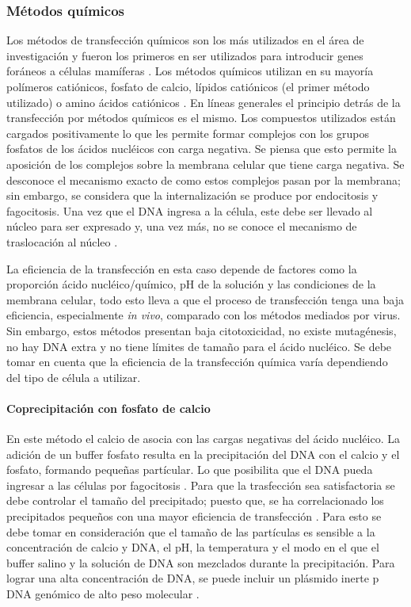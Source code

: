 \documentclass[fleqn,10pt]{SelfArx} %
\begin{document}
\subsubsection{Métodos químicos}
Los métodos de transfección químicos son los más utilizados en el área de investigación y fueron los primeros en ser utilizados para introducir genes foráneos a células mamíferas \cite{Schenborn2000}. Los métodos químicos utilizan en su mayoría polímeros catiónicos, fosfato de calcio, lípidos catiónicos (el primer método utilizado) o amino ácidos catiónicos \cite{Schenborn2000, Holmen:1995aa, Washbourne:2002aa}. En líneas generales el principio detrás de la transfección por métodos químicos es el mismo. Los compuestos utilizados están cargados positivamente lo que les permite formar complejos con los grupos fosfatos de los ácidos nucléicos con carga negativa. Se piensa que esto permite la aposición de los complejos sobre la membrana celular que tiene carga negativa. Se desconoce el mecanismo exacto de como estos complejos pasan por la membrana; sin embargo, se considera que la internalización se produce por endocitosis y fagocitosis. Una vez que el DNA ingresa a la célula, este debe ser llevado al núcleo para ser expresado y, una vez más, no se conoce el mecanismo de traslocación al núcleo \cite{Kim:2010aa}. 


La eficiencia de la transfección en esta caso depende de factores como la proporción ácido nucléico/químico, pH de la solución y las condiciones de la membrana celular, todo esto lleva a que el proceso de transfección tenga una baja eficiencia, especialmente \textit{in vivo}, comparado con los métodos mediados por virus. Sin embargo, estos métodos presentan baja citotoxicidad, no existe mutagénesis, no hay DNA extra y no tiene límites de tamaño para el ácido nucléico. Se debe tomar en cuenta que la eficiencia de la transfección química varía dependiendo del tipo de célula a utilizar.

\paragraph*{Coprecipitación con fosfato de calcio}
En este método el calcio de asocia con las cargas negativas del ácido nucléico. La adición de un buffer fosfato resulta en la precipitación del DNA con el calcio y el fosfato, formando pequeñas partícular.  Lo que posibilita que el DNA pueda ingresar a las células por fagocitosis \cite{Loyter:1982aa}. Para que la trasfección sea satisfactoria se debe controlar el tamaño del precipitado; puesto que, se ha correlacionado los precipitados pequeños con una mayor eficiencia de transfección \cite{Jordan:1996aa}. Para esto se debe tomar en consideración que el tamaño de las partículas es sensible a la concentración de calcio y DNA, el pH, la temperatura y el modo en el que el buffer salino y la solución de DNA son mezclados durante la precipitación. Para lograr una alta concentración de DNA, se puede incluir un plásmido inerte p DNA genómico de alto peso molecular \cite{Strain:1985aa}.
\end{document}
